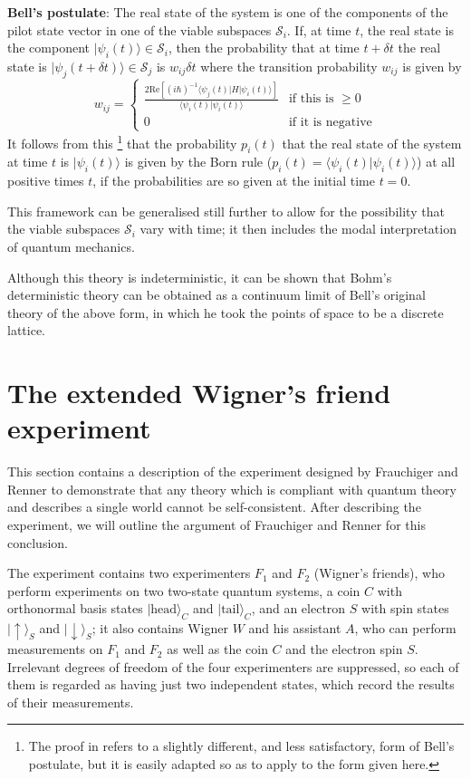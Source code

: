\documentclass[12pt,reqno]{article}
\newcommand{\head}{\text{head}}
\newcommand{\tail}{\text{tail}}
\newcommand{\semilinespace}{\vspace{0.5\baselineskip}}
\newcommand{\be}{\begin{equation}}
\newcommand{\ee}{\end{equation}}
\renewcommand{\(}{\left(}
\renewcommand{\)}{\right)}
\renewcommand{\.}{\centerdot}
\newcommand{\1}{\mathbf{1}}
\renewcommand{\S}{\mathcal{S}}
\newcommand{\<}{\langle}
\renewcommand{\>}{\rangle}
\theoremstyle{definition}
\theoremstyle{remark}
\numberwithin{equation}{section}
\begin{document}
\semilinespace

{\bf Bell's postulate}: The real state of the system is one of the components of the pilot state vector in one of the viable subspaces $\S_i$. If, at time $t$, the real state is the component $|\psi_i(t)\>\in\S_i$, then the probability that at time $t + \delta t$ the real state is $|\psi_j(t + \delta t)\>\in\S_j$ is $w_{ij}\delta t$ where the transition probability $w_{ij}$ is given by
\be\label{Bell}
w_{ij} = \begin{cases} \frac{2\text{Re}[(i\hbar)^{-1}\<\psi_j(t)|H|\psi_i(t)\>]}{\<\psi_i(t)|\psi_i(t)\>} &\text{if this is } \ge 0\\
                       0                                                  &\text{if it is negative}
         \end{cases}
\ee
It follows from this \cite{QMPN}\footnote{The proof in \cite{QMPN} refers to a slightly  different, and less satisfactory, form of Bell's postulate, but it is easily adapted so as to apply to the form given here.} that the probability $p_i(t) $ that the real state of the system at time $t$ is $|\psi_i(t)\>$ is given by the Born rule ($p_i(t) = \<\psi_i(t)|\psi_i(t)\>$) at all positive times $t$, if the probabilities are so given at the initial time $t = 0$.


This framework can be generalised still further \cite{BacciaDickson, verdammte} to allow for the possibility that the viable subspaces $\S_i$ vary with time; it then includes the modal interpretation of quantum mechanics.

Although this theory is indeterministic, it can be shown \cite{determlimit, Vink} that Bohm's deterministic theory can be obtained as a continuum limit of Bell's original theory of the above form, in which he took the points of space to be a discrete lattice.

\section{The extended Wigner's friend experiment}

This section contains a description of the experiment designed by Frauchiger and Renner \cite{FrauchigerRenner} to demonstrate that any theory which is compliant with quantum theory and describes a single world cannot be self-consistent. After describing the experiment, we will outline the argument of Frauchiger and Renner for this conclusion.

The experiment contains two experimenters $F_1$ and $F_2$ (Wigner's friends), who perform experiments on two two-state quantum systems, a coin $C$ with orthonormal basis states $|\head\>_C$ and $|\tail\>_C$, and an electron $S$ with spin states $|\uparrow\>_S$ and $|\downarrow\>_S$; it also contains Wigner $W$ and his assistant $A$, who can perform measurements on $F_1$ and $F_2$ as well as the coin $C$ and the electron spin $S$. Irrelevant degrees of freedom of the four experimenters are suppressed, so each of them is regarded as having just two independent states, which record the results of their measurements.
\end{document}
